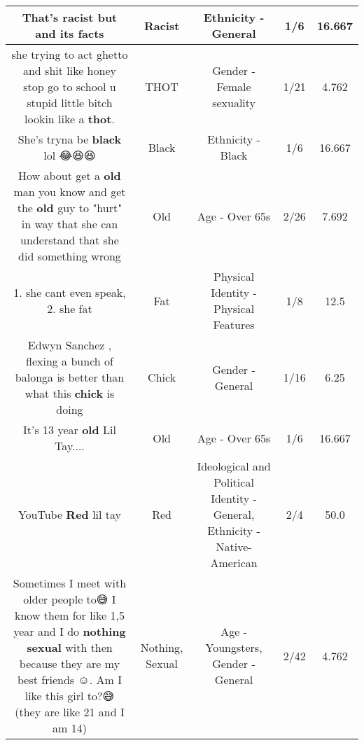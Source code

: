 \documentclass[11pt]{article}
\newlength\mylength
\begin{document}
\begin{center}
\begin{longtable}{|C{.65\mylength}|C{.30\mylength}|C{.12\mylength}|C{.12\mylength}|C{.12\mylength}|}
  \small That's \textbf{racist} but and its facts\normalsize   & Racist & Ethnicity - General & 1/6 & 16.667 \\  \hline
  \small she trying to act ghetto and shit like honey stop go to school u stupid little bitch lookin like a \textbf{thot}.\normalsize   & THOT & Gender - Female sexuality & 1/21 & 4.762 \\  \hline
  \small She's tryna be \textbf{black} lol 😂😆😆\normalsize   & Black & Ethnicity - Black & 1/6 & 16.667 \\  \hline
  \small How about get a \textbf{old} man you know and get the \textbf{old} guy to "hurt" in way that she can understand that she did something wrong\normalsize   & Old & Age - Over 65s & 2/26 & 7.692 \\  \hline
  \small 1. she cant even speak, 2. she fat\normalsize   & Fat & Physical Identity - Physical Features & 1/8 & 12.5 \\  \hline
  \small Edwyn Sanchez , flexing a bunch of balonga is better than what this \textbf{chick} is doing\normalsize   & Chick & Gender - General & 1/16 & 6.25 \\  \hline
  \small It's 13 year \textbf{old} Lil Tay....\normalsize   & Old & Age - Over 65s & 1/6 & 16.667 \\  \hline
  \small YouTube \textbf{R\textbf{ed}} lil tay\normalsize   & Red &  Ideological and Political Identity - General, Ethnicity - Native-American & 2/4 & 50.0 \\  \hline
  \small Sometimes I meet with older people to😅 I know them for like 1,5 year and I do \textbf{nothing} \textbf{sexual} with then because they are my best friends ☺. Am I like this girl to?😅 (they are like 21 and I am 14)\normalsize   & Nothing, Sexual & Age - Youngsters, Gender - General & 2/42 & 4.762 \\  \hline

\end{longtable}
\end{center}
\end{document}
